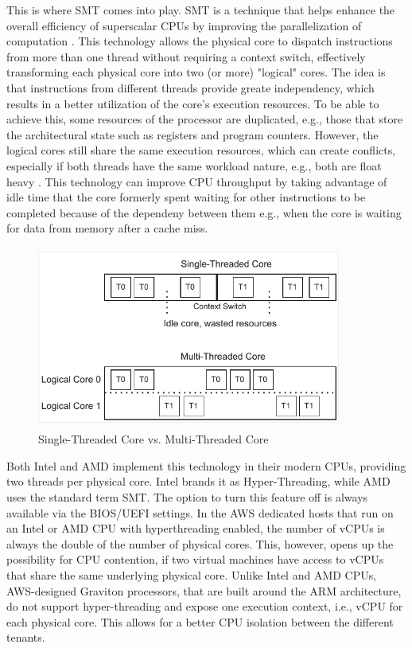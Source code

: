 \noindent
This is where \ac{SMT} comes into play. \acs{SMT} is a technique that helps enhance the overall efficiency of superscalar CPUs 
by improving the parallelization of computation \cite{wikipedia_hyperthreading}. This technology allows the 
physical core to dispatch instructions from more than one thread \cite{intel_hyperthreading} without requiring 
a context switch, effectively transforming each physical core into two (or more) "logical" cores. The idea is that instructions from different
threads provide greate independency, which results in a better utilization of the core's execution resources.
To be able to achieve this, some resources of the processor are duplicated, 
e.g., those that store the architectural state such as registers and program counters. However, the logical 
cores still share the same execution resources, which can create conflicts, especially if both threads have 
the same workload nature, e.g., both are float heavy \cite{wikipedia_hyperthreading}. This technology can 
improve CPU throughput by taking advantage of idle time that the core formerly spent waiting for other instructions 
to be completed because of the dependeny between them \cite{intel_hyperthreading} e.g., when the core is waiting for data from memory after a cache 
miss.
\begin{figure}[H]
    \centering
    \hspace*{-2cm} 
    \includegraphics[width=10cm, height=6cm]{figures/single_vs_multithreaded}
    \caption{Single-Threaded Core vs. Multi-Threaded Core}
    \label{fig:all}
\end{figure}
\noindent
Both Intel and AMD implement this technology in their modern CPUs, providing two threads per physical core. 
Intel brands it as Hyper-Threading, while AMD uses the standard term \ac{SMT}. The option to turn this 
feature off is always available via the BIOS/UEFI settings. In the AWS dedicated hosts that run on an Intel or 
AMD CPU with hyperthreading enabled, the number of vCPUs is always the double of the number of physical cores. 
This, however, opens up the possibility for CPU contention, if two virtual machines have access to vCPUs that 
share the same underlying physical core. Unlike Intel and AMD CPUs, AWS-designed Graviton processors, that 
are built around the ARM architecture, do not support hyper-threading \cite{thorat2024graviton} and 
expose one execution context, i.e., vCPU for each physical core. This allows for a better CPU isolation 
between the different tenants. 

